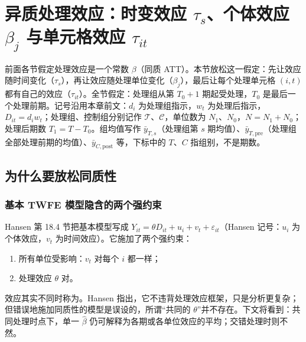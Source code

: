 
\section{异质处理效应：时变效应 \texorpdfstring{$\tau_s$}{tau\_s}、个体效应 \texorpdfstring{$\beta_j$}{beta\_j} 与单元格效应 \texorpdfstring{$\tau_{it}$}{tau\_it}}\label{sec:U15b-hetero}

前面各节假定处理效应是一个常数 $\beta$（同质 ATT）。本节放松这一假定：先让效应随时间变化（$\tau_s$），再让效应随处理单位变化（$\beta_j$），最后让每个处理单元格 $(i,t)$ 都有自己的效应（$\tau_{it}$）。全节假定：处理组从第 $T_0+1$ 期起受处理，$T_0$ 是最后一个处理前期。记号沿用本章前文：$d_i$ 为处理组指示，$w_t$ 为处理后指示，$D_{it}=d_iw_t$；处理组、控制组分别记作 $\mathcal T$、$\mathcal C$，单位数为 $N_1$、$N_0$，$N=N_1+N_0$；处理后期数 $T_1=T-T_0$。组均值写作 $\bar y_{T,s}$（处理组第 $s$ 期均值）、$\bar y_{T,\mathrm{pre}}$（处理组全部处理前期的均值）、$\bar y_{C,\mathrm{post}}$ 等，下标中的 $T$、$C$ 指组别，不是期数。

\subsection{为什么要放松同质性}

\subsubsection{基本 TWFE 模型隐含的两个强约束}

Hansen 第 18.4 节把基本模型写成 $Y_{it}=\theta D_{it}+u_i+v_t+\varepsilon_{it}$（Hansen 记号：$u_i$ 为个体效应，$v_t$ 为时间效应）。它施加了两个强约束：
\begin{enumerate}
  \item 所有单位受影响：$v_t$ 对每个 $i$ 都一样；
  \item 处理效应 $\theta$ 对。
\end{enumerate}
效应其实不同时称为。Hansen 指出，它不违背处理效应框架，只是分析更复杂；但错误地施加同质性的模型是误设的，所谓“共同的 $\theta$”并不存在。下文将看到：共同处理时点下，单一 $\hat\beta$ 仍可解释为各期或各单位效应的平均；交错处理时则不然。

